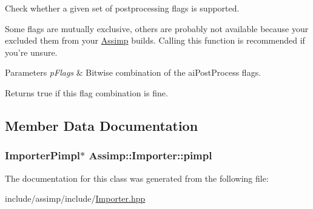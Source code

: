 Check whether a given set of postprocessing flags is supported. 

Some flags are mutually exclusive, others are probably not available because your excluded them from your \hyperlink{namespace_assimp}{Assimp} builds. Calling this function is recommended if you're unsure.


\begin{DoxyParams}{Parameters}
{\em p\-Flags} & Bitwise combination of the ai\-Post\-Process flags. \\
\hline
\end{DoxyParams}
\begin{DoxyReturn}{Returns}
true if this flag combination is fine. 
\end{DoxyReturn}


\subsection{Member Data Documentation}
\hypertarget{class_assimp_1_1_importer_a3928bb8d375fd676dd5dbe33382e46ce}{
\subsubsection[{pimpl}]{\setlength{\rightskip}{0pt plus 5cm}Importer\-Pimpl$\ast$ Assimp\-::\-Importer\-::pimpl\hspace{0.3cm}{\ttfamily [protected]}}}\label{class_assimp_1_1_importer_a3928bb8d375fd676dd5dbe33382e46ce}


The documentation for this class was generated from the following file\-:\begin{DoxyCompactItemize}
\item 
include/assimp/include/\hyperlink{_importer_8hpp}{Importer.\-hpp}\end{DoxyCompactItemize}
